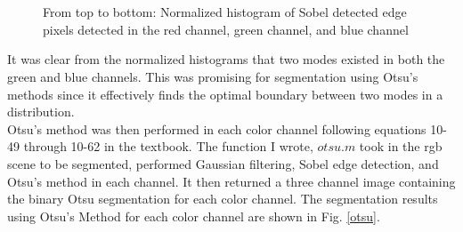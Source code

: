 \documentclass{article}[12 pt]
\begin{document}
\begin{figure}[H]
\captionsetup[subfloat]{labelformat=empty}
\centering
{} \\
 \\
\caption{From top to bottom: Normalized histogram of Sobel detected edge pixels detected in the red channel, green channel, and blue channel}
\label{hist}
\end{figure}

\noindent
It was clear from the normalized histograms that two modes existed in both the green and blue channels. This was promising for segmentation using Otsu's methods since it effectively finds the optimal boundary between two modes in a distribution. \\

\noindent
Otsu's method was then performed in each color channel following equations 10-49 through 10-62 in the textbook.  The function I wrote, $otsu.m$ took in the rgb scene to be segmented, performed Gaussian filtering, Sobel edge detection, and Otsu's method in each channel.  It then returned a three channel image containing the binary Otsu segmentation for each color channel. The segmentation results using Otsu's Method for each color channel are shown in Fig. \ref{otsu}.
\end{document}
